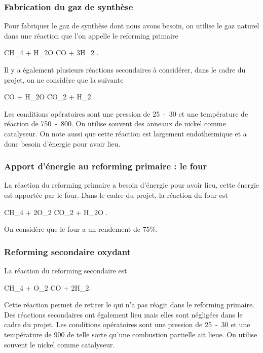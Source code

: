 \subsubsection{Fabrication du gaz de synthèse}
Pour fabriquer le gaz de synthèse 
dont nous avons besoin, on utilise le gaz naturel
 dans une réaction que l'on appelle
le reforming primaire 
\begin{chemmath}
	CH_4 + H_2O \Leftrightarrow CO + 3H_2 .
\end{chemmath}
Il y a également plusieurs réactions secondaires à
considérer, dans le cadre du projet, on ne considère
que la suivante
\begin{chemmath}
	CO + H_2O \Leftrightarrow CO_2 + H_2.
\end{chemmath}
Les conditions opératoires sont une pression
de \unit{25-30}{\bbar} et une température
de réaction de \unit{750-800}{\degreecelsius}.
On utilise souvent des anneaux de nickel comme
catalyseur.
On note aussi que cette réaction est largement
endothermique et a donc besoin d'énergie pour avoir
lieu.

\subsubsection{Apport d'énergie au reforming primaire : le four}
La réaction du reforming primaire a besoin
d'énergie pour avoir lieu, cette énergie est apportée
par le four. Dans le cadre du projet, la réaction
du four est
\begin{chemmath}
	CH_4 + 2O_2 \rightarrow CO_2 + H_2O .
\end{chemmath}
On considère que le four a un rendement de 75\%.

\subsubsection{Reforming secondaire oxydant}
La réaction du reforming secondaire est
\begin{chemmath}
	CH_4 + O_2 \rightarrow CO + 2H_2.
\end{chemmath}
Cette réaction permet de retirer le  qui n'a
pas réagit dans le reforming primaire. %
Des réactions secondaires ont également lieu mais elles
sont négligées dans le cadre du projet.
Les conditions opératoires sont une pression
de \unit{25-30}{\bbar} et une température
de \unit{900}{\degreecelsius} de telle sorte
qu'une combustion partielle ait lieue.
On utilise souvent le nickel comme catalyseur.

